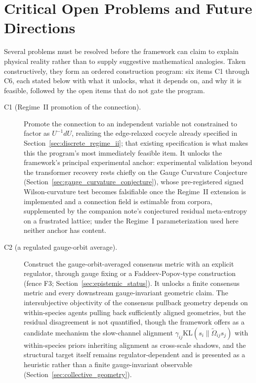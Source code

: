 \documentclass[11pt]{article}
\begin{document}
\section{Critical Open Problems and Future Directions}\label{sec:open_problems}

Several problems must be resolved before the framework can claim to explain physical reality rather than to supply suggestive mathematical analogies. Taken constructively, they form an ordered construction program: six items C1 through C6, each stated below with what it unlocks, what it depends on, and why it is feasible, followed by the open items that do not gate the program.

\begin{description}
\item[C1 (Regime~II promotion of the connection).] Promote the connection to an independent variable not constrained to factor as $U^{-1}dU$, realizing the edge-relaxed cocycle already specified in Section~\ref{sec:discrete_regime_ii}; that existing specification is what makes this the program's most immediately feasible item. It unlocks the framework's principal experimental anchor: experimental validation beyond the transformer recovery rests chiefly on the Gauge Curvature Conjecture (Section~\ref{sec:gauge_curvature_conjecture}), whose pre-registered signed Wilson-curvature test becomes falsifiable once the Regime~II extension is implemented and a connection field is estimable from corpora, supplemented by the companion note's conjectured residual meta-entropy on a frustrated lattice; under the Regime~I parameterization used here neither anchor has content.
\item[C2 (a regulated gauge-orbit average).] Construct the gauge-orbit-averaged consensus metric with an explicit regulator, through gauge fixing or a Faddeev-Popov-type construction (fence F3; Section~\ref{sec:epistemic_status}). It unlocks a finite consensus metric and every downstream gauge-invariant geometric claim. The intersubjective objectivity of the consensus pullback geometry depends on within-species agents pulling back sufficiently aligned geometries, but the residual disagreement is not quantified, though the framework offers as a candidate mechanism the slow-channel alignment $\gamma_{ij}\mathrm{KL}(s_i \| \tilde\Omega_{ij} s_j)$ with within-species priors inheriting alignment as cross-scale shadows, and the structural target itself remains regulator-dependent and is presented as a heuristic rather than a finite gauge-invariant observable (Section~\ref{sec:collective_geometry}).

\end{description}
\end{document}
